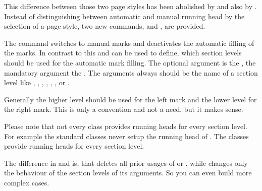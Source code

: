 This difference between those two page styles has been abolished by
 and also by . Instead of distinguishing
between automatic and manual running head by the selection of a page style,
two new commands,  and , are provided. 

The command  switches to manual marks and deactivates the
automatic filling of the marks. In contrast to this  and
 can be used to define, which section levels should be used
for the automatic mark filling. The optional argument is the , the mandatory argument the . The arguments always should be the name of a section level
like , , , ,
, , or .

Generally the higher level should be used for the left mark and the lower
level for the right mark. This is only a convention and not a need, but it
makes sense.

Please note that not every class provides running heads
for every section level. For example the standard classes never setup the
running head of . The \KOMAScript{} classes provide running heads
for every section level.

The difference in  and  is, that
 deletes all prior usages of  or
, while  changes only the behaviour of the
section levels of its arguments. So you can even build more complex cases.

